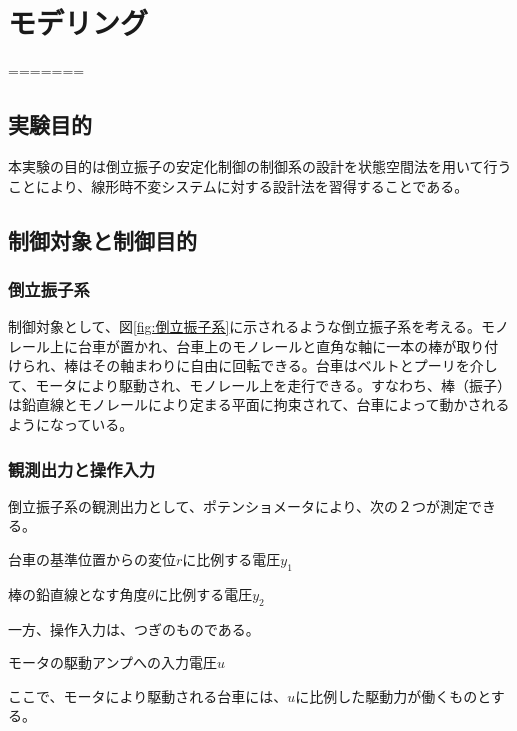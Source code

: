 \documentclass[a4j,11pt,twoside]{ujbook}
\begin{document}
\chapter{モデリング}
=======
	\section{実験目的}
		本実験の目的は倒立振子の安定化制御の制御系の設計を状態空間法を用いて行うことにより、線形時不変システムに対する設計法を習得することである。
	\section{制御対象と制御目的}
		\subsection{倒立振子系}
			制御対象として、図\ref{fig:倒立振子系}に示されるような倒立振子系を考える。モノレール上に台車が置かれ、台車上のモノレールと直角な軸に一本の棒が取り付けられ、棒はその軸まわりに自由に回転できる。台車はベルトとプーリを介して、モータにより駆動され、モノレール上を走行できる。すなわち、棒（振子）は鉛直線とモノレールにより定まる平面に拘束されて、台車によって動かされるようになっている。

		\subsection{観測出力と操作入力}
			倒立振子系の観測出力として、ポテンショメータにより、次の２つが測定できる。
			\begin{description}
				\setlength{\itemindent}{0pt}
				\item[1°] 台車の基準位置からの変位$r$に比例する電圧$y_1$
				\item[2°] 棒の鉛直線となす角度$\theta$に比例する電圧$y_2$
			\end{description}
			一方、操作入力は、つぎのものである。
			\begin{description}
			\setlength{\itemindent}{0pt}
			\item[1°] モータの駆動アンプへの入力電圧$u$
			\end{description}
			ここで、モータにより駆動される台車には、$u$に比例した駆動力が働くものとする。
\end{document}
